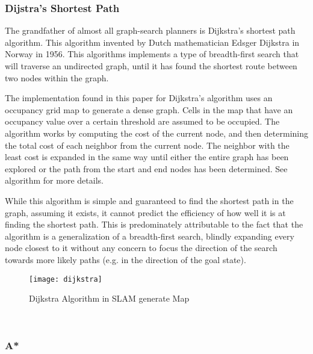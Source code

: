 \subsubsection{Dijstra's Shortest Path}
The grandfather of almost all graph-search planners is Dijkstra's shortest path algorithm. This algorithm invented by Dutch mathematician Edsger Dijkstra in Norway in 1956. This algorithms implements a type of breadth-first search that will traverse an undirected graph, until it has found the shortest route between two nodes within the graph. 

The implementation found in this paper for Dijkstra's algorithm uses an occupancy grid map to generate a dense graph. Cells in the map that have an occupancy value over a certain threshold are assumed to be occupied. The algorithm works by computing the cost of the current node, and then determining the total cost of each neighbor from the current node. The neighbor with the least cost is expanded in the same way until either the entire graph has been explored or the path from the start and end nodes has been determined. See algorithm for more details.

While this algorithm is simple and guaranteed to find the shortest path in the graph, assuming it exists, it cannot predict the efficiency of how well it is at finding the shortest path. This is predominately attributable to the fact that the algorithm is a generalization of a breadth-first search, blindly expanding every node closest to it without any concern to focus the direction of the search towards more likely paths (e.g. in the direction of the goal state).






\begin{figure}[h!]
    \texttt{[image: dijkstra]}
    \centering
    \label{fig:Dijkstra}
    \caption{Dijkstra Algorithm in SLAM generate Map}
  \end{figure}

  \\

\subsubsection{A*}

